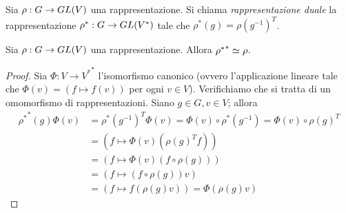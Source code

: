 \begin{definition}
Sia $\rho:G\to GL(V)$ una rappresentazione. Si chiama \emph{rappresentazione duale} la rappresentazione $\rho^*:G\to GL(V^*)$ tale che $\rho^*(g)=\rho(g^{-1})^T$.

\end{definition}

\begin{proposition}
Sia $\rho:G\to GL(V)$ una rappresentazione. Allora ${\rho^*}^*\simeq\rho$.
\end{proposition}
\begin{proof}
Sia $\Phi:V\to{V^*}^*$ l'isomorfismo canonico (ovvero l'applicazione lineare tale che $\Phi(v)=(f\mapsto f(v))$ per ogni $v\in V$). Verifichiamo che si tratta di un omomorfismo di rappresentazioni. Siano $g\in G,v\in V$; allora
\begin{align*}
{\rho^*}^*(g)\Phi(v)&=\rho^*(g^{-1})^T\Phi(v)=\Phi(v)\circ\rho^*(g^{-1})=\Phi(v)\circ\rho(g)^T\\
&=(f\mapsto\Phi(v)(\rho(g)^Tf))\\
&=(f\mapsto\Phi(v)(f\circ\rho(g)))\\
&=(f\mapsto(f\circ\rho(g))v)\\
&=(f\mapsto f(\rho(g)v))=\Phi(\rho(g)v)
\end{align*}
\end{proof}

